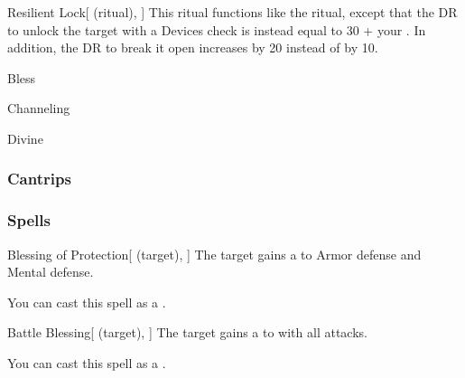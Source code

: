 \lowercase{\hypertarget{spell:Resilient Lock}{}}\label{spell:Resilient Lock}
\begin{attuneability}[Rank 5]{\hypertarget{spell:Resilient Lock}{Resilient Lock}}[ (ritual), ]
This ritual functions like the  ritual, except that the DR to unlock the target with a Devices check is instead equal to 30 + your .
In addition, the DR to break it open increases by 20 instead of by 10.
\end{attuneability}
\vspace{0.25em}


\newpage
\begin{spellsection}{Bless}

\begin{spellheader}
\end{spellheader}


 Channeling

 Divine

\subsubsection{Cantrips}


\end{spellsection}


\subsubsection{Spells}


\lowercase{\hypertarget{spell:Blessing of Protection}{}}\label{spell:Blessing of Protection}
\begin{attuneability}[Rank 1]{\hypertarget{spell:Blessing of Protection}{Blessing of Protection}}[ (target), ]
The target gains a   to Armor defense and Mental defense.

You can cast this spell as a .
\end{attuneability}
\vspace{0.25em}



\lowercase{\hypertarget{spell:Battle Blessing}{}}\label{spell:Battle Blessing}
\begin{attuneability}[Rank 3]{\hypertarget{spell:Battle Blessing}{Battle Blessing}}[ (target), ]
The target gains a   to  with all attacks.

You can cast this spell as a .
\end{attuneability}
\vspace{0.25em}



